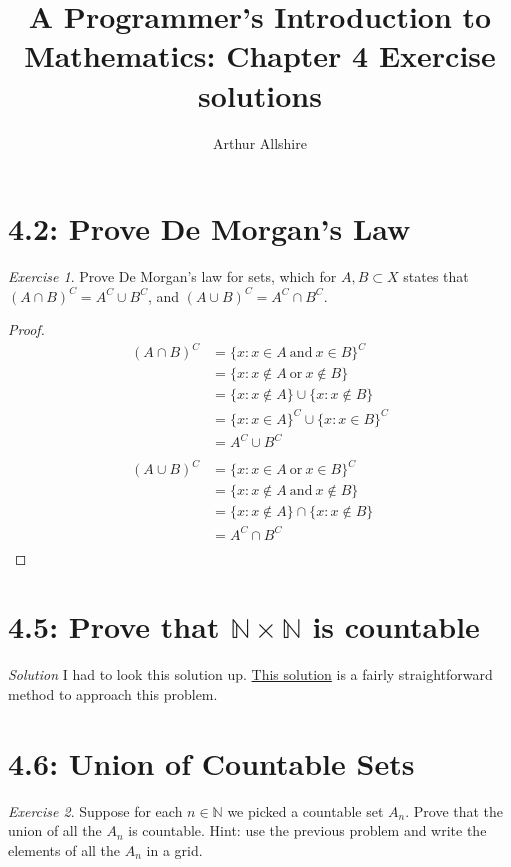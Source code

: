 \documentclass{article}
\author{Arthur Allshire}
\title{A Programmer's Introduction to Mathematics: Chapter 4 Exercise solutions}
\theoremstyle{remark}
\newtheorem*{exercise}{Exercise}
\begin{document}
\maketitle

\section*{4.2: Prove De Morgan's Law}
\begin{exercise}
    Prove De Morgan's law for sets, which for $A, B \subset X$
    states that $(A \cap B)^{C} = A^{C} \cup B^{C}$, and $(A \cup B)^{C} = A^{C} \cap B^{C}$.
\end{exercise}

\begin{proof}

\[
\begin{aligned}
    (A \cap B)^{C} &= \{x : x \in A \:\text{and}\: x \in B\}^{C} \\
             &= \{x : x \not\in A \:\text{or}\: x \not\in B\} \\
             &= \{x : x \not\in A\} \cup \{x: x \not\in B\} \\
             &= \{x : x \in A\}^C \cup \{x: x \in B\}^C \\
             &= A^C \cup B^C \\
\\
    (A \cup B)^{C} &= \{x : x \in A \:\text{or}\: x \in B\}^{C} \\
             &= \{x : x \not\in A \:\text{and}\: x \not\in B\} \\
             &= \{x : x \not\in A\} \cap \{x:  x \not\in B\} \\
             &= A^C \cap B^C \\
\end{aligned}
\]

\end{proof}

\section*{4.5: Prove that $\mathbb{N}\times\mathbb{N}$ is countable}

{\it Solution} I had to look this solution up.
\href{https://math.stackexchange.com/questions/91665/proving-mathbbnk-is-countable/91678#91678}{This solution}
is a fairly straightforward method to approach this problem.

\section*{4.6: Union of Countable Sets}
\begin{exercise}
    Suppose for each $n \in \mathbb{N}$ we picked a countable set $A_n$. Prove that
    the union of all the $A_n$ is countable. Hint: use the previous problem and write the elements of all the
    $A_n$ in a grid.
\end{exercise}
\end{document}
